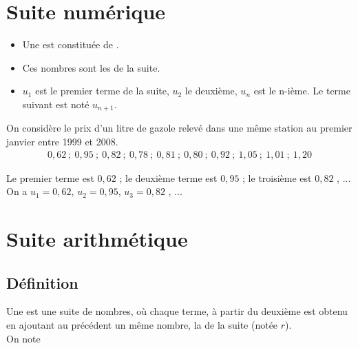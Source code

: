 \documentclass[12pt,a4paper]{article}
\date{}
\title{}
\begin{document}
{}

\section{Suite numérique}

\begin{mydef}
	\begin{itemize}
		\item Une  est constituée de .
		\item Ces nombres sont les  de la suite.
		\item $u_1$ est le premier terme de la suite, $u_2$ le deuxième, $u_n$ est le n-ième. Le terme suivant est noté $u_{n+1}$.
	\end{itemize}
	
\end{mydef}

\begin{myex}
	On considère le prix d'un litre de gazole relevé dans une même station au premier janvier entre 1999 et 2008.
	\begin{align*}
	0,62 \:;\: 0,95 \:;\: 0,82 \:; \:0,78 \:;\: 0,81 \:;\: 0,80 \:;\: 0,92 \:;\: 1,05 \:;\: 1,01 \:; \:1,20
	\end{align*}
	
	Le premier terme est $0,62$ ; le deuxième terme est $0,95$ ; le troisième est $0,82$ , ...
	On a
	$u_1=0,62$, $u_2=0,95$, $u_3=0,82$ , ...
\end{myex}

\section{Suite arithmétique}

\subsection{Définition}
\begin{mydef}
	Une  est une suite de nombres, où chaque terme, à partir du deuxième est obtenu en ajoutant au précédent un même nombre, la  de la suite (notée $r$).\\
	
	On note
\end{mydef}
\end{document}
